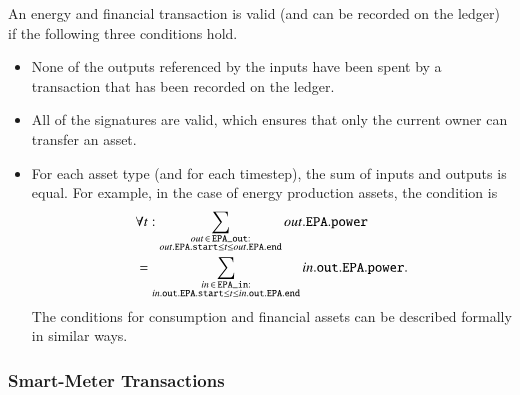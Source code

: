 An energy and financial transaction is valid (and can be recorded on the ledger) if the following three conditions hold.
\begin{itemize}[noitemsep,topsep=-\parskip]
\item None of the outputs referenced by the inputs have been spent by a transaction that has been recorded on the ledger.
\item All of the signatures are valid, which ensures that only the current owner can transfer an asset.
\item For each asset type (and for each timestep), the sum of inputs and outputs is equal.
For example, in the case of energy production assets, the condition is
\begin{align*}
& \forall t: \sum_{\substack{out \,\in\, \field{EPA\_out}:\\out.\field{EPA}.\field{start} \leq t \leq out.\field{EPA}.\field{end}}} out.\field{EPA}.\field{power} \nonumber \\
& = \sum_{\substack{in \,\in\, \field{EPA\_in}:\\in.\field{out}.\field{EPA}.\field{start} \leq t \leq in.\field{out}.\field{EPA}.\field{end}}} in.\field{out}.\field{EPA}.\field{power}  .
%
\end{align*}
The conditions for consumption and financial assets can be described formally in similar ways.
\end{itemize}

\subsubsection{Smart-Meter Transactions}

